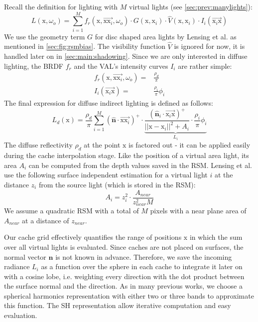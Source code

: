 \documentclass[thesis.tex]{subfiles}
\begin{document}
Recall the definition for lighting with $M$ virtual lights (see \autoref{sec:prev:manylights}):
\begin{equation}
L(\mathrm{x}, \omega_o) = \sum\limits_{i=1}^{M} f_r(\mathrm{x}, \overrightarrow{\mathrm{x}\mathrm{x}_i}, \omega_o) \cdot G(\mathrm{x}, \mathrm{x}_i) \cdot \hat{V}(\mathrm{x}, \mathrm{x}_i) \cdot I_i(\overrightarrow{\mathrm{x}_i\mathrm{x}})
\end{equation}
We use the geometry term $G$ for disc shaped area lights by Lensing et al. \cite{bib:LightskinPaper} as mentioned in \autoref{sec:fig:rsmbias}.
The visibility function $\hat{V}$ is ignored for now, it is handled later on in \autoref{sec:main:shadowing}.
Since we are only interested in diffuse lighting, the BRDF $f_r$ and the VAL's intensity curves $I_i$ are rather simple:
\begin{align}
f_r(\mathrm{x}, \overrightarrow{\mathrm{x}\mathrm{x}_i}, \omega_o) =& \frac{\rho_d}{\pi}\\
I_i(\overrightarrow{\mathrm{x}_i\mathrm{x}}) =& \frac{\rho_i}{\pi} \phi_i
\end{align}
The final expression for diffuse indirect lighting is defined as follows:
\begin{equation} \label{eq:rsmdiffuse}
L_d (\mathrm{x}) = \frac{\rho_d}{\pi} \sum\limits_{i=1}^{M} 
(\hat{\mathbf{n}} \cdot \overrightarrow{\mathrm{x}\mathrm{x}_i} )^+ \cdot
\underbrace{\frac{(\hat{\mathbf{n}}_i\cdot \overrightarrow{\mathrm{x}_i\mathrm{x}})^+}{||\mathrm{x} - \mathrm{x}_i||^2 + A_i} \cdot  \frac{\rho_i}{\pi} \phi_i}_{L_i}
\end{equation}
The diffuse reflectivity $\rho_d$ at the point $\mathrm{x}$ is factored out - it can be applied easily during the cache interpolation stage.
Like the position of a virtual area light, its area $A_i$ can be computed from the depth values saved in the RSM.
Lensing et al. \cite{bib:LightskinPaper} use the following surface independent estimation for a virtual light $i$ at the distance $z_i$ from the source light (which is stored in the RSM):
\begin{equation}
A_i = z_i^2 \cdot \frac{A_{near}}{z_{near}^2 M}
\end{equation}
We assume a quadratic RSM with a total of $M$ pixels with a near plane area of $A_{near}$ at a distance of $z_{near}$.

Our cache grid effectively quantifies the range of positions $\mathrm{x}$ in which the sum over all virtual lights is evaluated.
Since caches are not placed on surfaces, the normal vector $\hat{\mathbf{n}}$ is not known in advance.
Therefore, we save the incoming radiance $L_i$ as a function over the sphere in each cache to integrate it later on with a cosine lobe, i.e. weighting every direction with the dot product between the surface normal and the direction.
As in many previous works, we choose a spherical harmonics representation with either two or three bands to approximate this function.
The SH representation allow iterative computation and easy evaluation.
\end{document}
